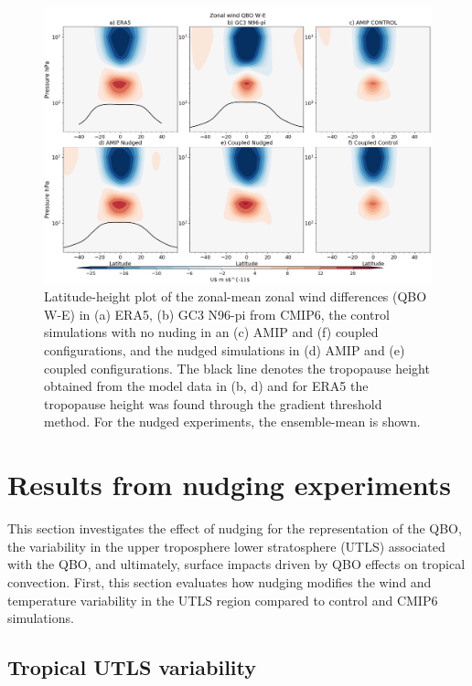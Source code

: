 \begin{figure}[t!]
\centering
 \includegraphics[width=\linewidth]{figures/zonalplotx_wind.png}
\caption[Zonal mean zonal wind QBO difference]{Latitude-height plot of the zonal-mean zonal wind differences (QBO W-E) in (a) ERA5, (b) GC3 N96-pi from CMIP6, the control simulations with no nuding in an (c) AMIP and (f) coupled configurations, and the nudged simulations in (d) AMIP and (e) coupled configurations. The black line denotes the tropopause height obtained from the model data in (b, d) and for ERA5 the tropopause height was found through the gradient threshold method. For the nudged experiments, the ensemble-mean is shown. }
\label{fig:zonal_u}
\end{figure}

\section{ Results from nudging experiments}




This section investigates the effect of nudging for the representation of the QBO, the variability in the upper troposphere lower stratosphere (UTLS) associated with the QBO, and ultimately, surface impacts driven by QBO effects on tropical convection. 
First, this section evaluates how nudging modifies the wind and temperature variability in the UTLS region compared to control and CMIP6 simulations.  



\subsection{Tropical UTLS variability}


